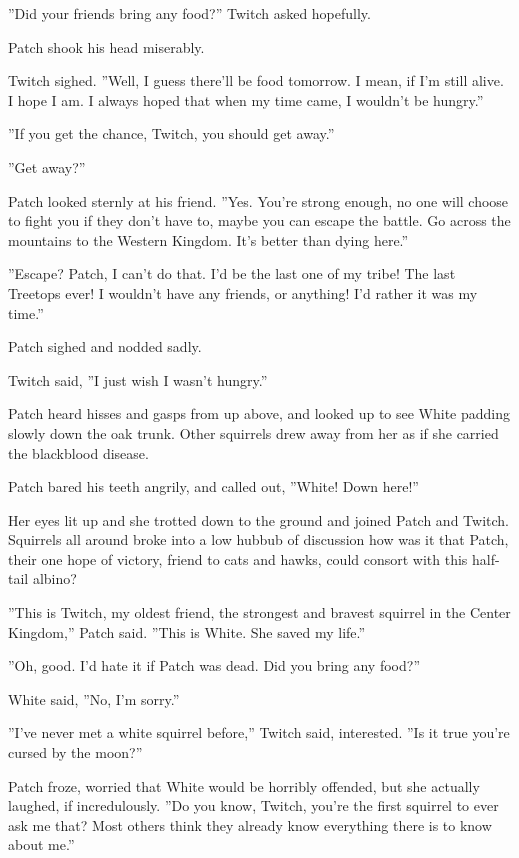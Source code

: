 \documentclass[11pt]{article}
\begin{document}
 ''Did your friends bring any food?'' Twitch asked hopefully.\par
 Patch shook his head miserably.\par
 Twitch sighed. ''Well, I guess there'll be food tomorrow. I mean, if I'm still alive. I hope I am. I always hoped that when my time came, I wouldn't be hungry.''\par
 ''If you get the chance, Twitch, you should get away.''\par
 ''Get away?''\par
 Patch looked sternly at his friend. ''Yes. You're strong enough, no one will choose to fight you if they don't have to, maybe you can escape the battle. Go across the mountains to the Western Kingdom. It's better than dying here.''\par
 ''Escape? Patch, I can't do that. I'd be the last one of my tribe! The last Treetops ever! I wouldn't have any friends, or anything! I'd rather it was my time.''\par
 Patch sighed and nodded sadly.\par
 Twitch said, ''I just wish I wasn't hungry.''\par
 Patch heard hisses and gasps from up above, and looked up to see White padding slowly down the oak trunk. Other squirrels drew away from her as if she carried the blackblood disease.\par
 Patch bared his teeth angrily, and called out, ''White! Down here!''\par
 Her eyes lit up and she trotted down to the ground and joined Patch and Twitch. Squirrels all around broke into a low hubbub of discussion %
 how was it that Patch, their one hope of victory, friend to cats and hawks, could consort with this half-tail albino?\par
 ''This is Twitch, my oldest friend, the strongest and bravest squirrel in the Center Kingdom,'' Patch said. ''This is White. She saved my life.''\par
 ''Oh, good. I'd hate it if Patch was dead. Did you bring any food?''\par
 White said, ''No, I'm sorry.''\par
 ''I've never met a white squirrel before,'' Twitch said, interested. ''Is it true you're cursed by the moon?''\par
 Patch froze, worried that White would be horribly offended, but she actually laughed, if incredulously. ''Do you know, Twitch, you're the first squirrel to ever ask me that? Most others think they already know everything there is to know about me.''\par
\end{document}
